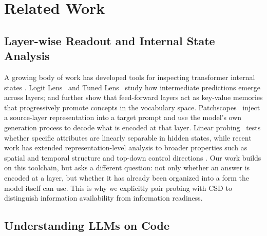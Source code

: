 \section{Related Work}
\label{sec:related_work}

\subsection{Layer-wise Readout and Internal State Analysis}

A growing body of work has developed tools for inspecting transformer internal states \citep[see][for a review]{bereska2024mechanistic}.
Logit Lens~\citep{nostalgebraist2020} and Tuned Lens~\citep{belrose2023eliciting} study how intermediate predictions emerge across layers; \citet{geva2021kv} and \citet{geva2022transformer} further show that feed-forward layers act as key-value memories that progressively promote concepts in the vocabulary space.
Patchscopes~\citep{ghandeharioun2024patchscopes} inject a source-layer representation into a target prompt and use the model's own generation process to decode what is encoded at that layer.
Linear probing~\citep{hewitt2019structural, hewitt2019designing, belinkov2022probing} tests whether specific attributes are linearly separable in hidden states, while recent work has extended representation-level analysis to broader properties such as spatial and temporal structure \citep{gurnee2024spacetime, burns2023discovering} and top-down control directions \citep{zou2023representation}.
Our work builds on this toolchain, but asks a different question: not only whether an answer is encoded at a layer, but whether it has already been organized into a form the model itself can use.
This is why we explicitly pair probing with CSD to distinguish information availability from information readiness.

\subsection{Understanding LLMs on Code}

